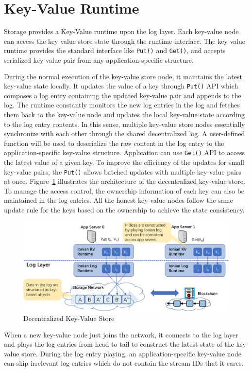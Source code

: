 \section{Key-Value Runtime}

\projabbrev Storage provides a Key-Value runtime upon the log layer. 
Each key-value node can access the key-value store state through the runtime interface. 
The key-value runtime provides the standard interface like \texttt{Put()} and \texttt{Get()}, and accepts serialized key-value pair from any application-specific structure. 

During the normal execution of the key-value store node, it maintains the latest key-value state locally. It updates the value of a key through \texttt{Put()} API which composes a log entry containing the updated key-value pair and appends to the log. 
The runtime constantly monitors the new log entries in the log and fetches them back to the key-value node and updates the local key-value state according to the log entry contents. 
In this sense, multiple key-value store nodes essentially synchronize with each other through the shared decentralized log.
A user-defined function will be used to deserialize the raw content in the log entry to the application-specific key-value structure.
Application can use \texttt{Get()} API to access the latest value of a given key. 
To improve the efficiency of the updates for small key-value pairs, the \texttt{Put()} allows batched updates with multiple key-value pairs at once. 
Figure~\ref{fig:kv} illustrates the architecture of the decentralized key-value store. 
To manage the access control, the ownership information of each key can also be maintained in the log entries.
All the honest key-value nodes follow the same update rule for the keys based on the ownership to achieve the state consistency.

\begin{figure}[H]	
	\includegraphics[width=\textwidth]{figure/kv-crop.pdf}
	\caption{Decentralized Key-Value Store}
	\label{fig:kv}
\end{figure}

When a new key-value node just joins the network, it connects to the log layer and plays the log entries from head to tail to construct the latest state of the key-value store.
During the log entry playing, an application-specific key-value node can skip irrelevant log entries which do not contain the stream IDs that it cares.

